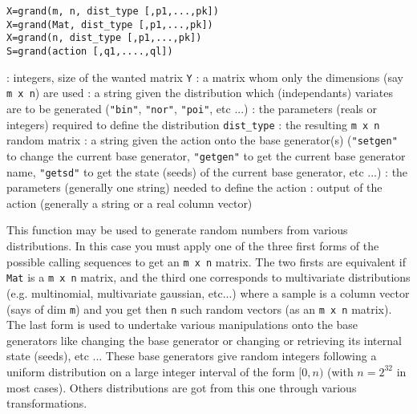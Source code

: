 \begin{mandesc}
\end{mandesc}
\begin{calling_sequence}
\begin{verbatim}
X=grand(m, n, dist_type [,p1,...,pk])  
X=grand(Mat, dist_type [,p1,...,pk])  
X=grand(n, dist_type [,p1,...,pk])  
S=grand(action [,q1,....,ql])  
\end{verbatim}
\end{calling_sequence}
\begin{parameters}
  \begin{varlist}
    : integers, size of the wanted matrix \verb!Y!
   : a matrix whom only the dimensions (say \verb!m x n!) are used
   : a string given the distribution which (independants) variates are to be 
     generated (\verb!"bin"!, \verb!"nor"!, \verb!"poi"!, etc ...)
   : the parameters (reals or integers) required to define the distribution 
    \verb!dist_type!
   : the resulting \verb!m x n! random matrix
   : a string given the action onto the base generator(s) (\verb!"setgen"! to change the current base 
     generator,  \verb!"getgen"! to get the current base generator name, \verb!"getsd"! to get the 
     state (seeds) of the current base generator, etc ...)
   : the parameters (generally one string) needed to define the action
   : output of the action (generally a string or a real column vector)
  \end{varlist}
  \end{parameters}
  
\begin{mandescription}
  This function may be used to generate random numbers from various distributions. In this 
  case you must apply one of the three first forms of the possible
  calling sequences to get an \verb!m x n! matrix. 
  The two firsts are equivalent if \verb!Mat! is a \verb!m x n! matrix, 
  and the third one corresponds to multivariate distributions (e.g. multinomial, multivariate
  gaussian, etc...) where a sample is a column vector (says of dim \verb!m!)
  and you get then \verb!n! such random vectors (as an \verb!m x n! matrix). 
  The last form is used to undertake various manipulations onto the base generators
  like changing the base generator or changing or retrieving its internal state (seeds), 
  etc ... These base generators give random integers following a
  uniform distribution on a large integer interval of the form $[0,n)$
  (with $n=2^{32}$ in most cases). Others distributions are got from
  this one through various transformations.
\end{mandescription}

